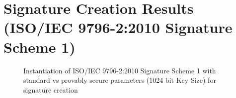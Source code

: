 \documentclass[]{final_report}
\theoremstyle{definition}
\begin{document}
\section{Signature Creation Results (ISO/IEC 9796-2:2010 Signature Scheme 1)}

\begin{figure}[H]
    \centering %
     \caption{Instantiation of ISO/IEC 9796-2:2010 Signature Scheme 1 with standard vs provably secure parameters (1024-bit Key Size) for signature creation}
    \begin{minipage}{\textwidth}
        \centering
    \end{minipage}
            \label{iso_sign_1024bit_table}
  \end{figure}
  
\end{document}
